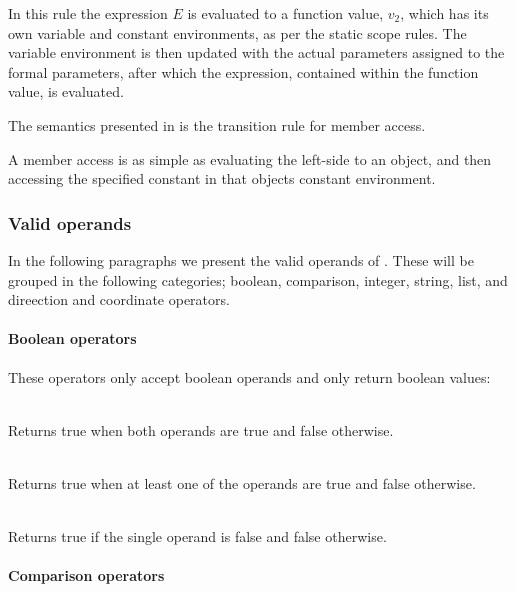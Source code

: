 In this rule the expression $E$ is evaluated to a function value, $v_2$, which
has its own variable and constant environments, as per the static scope rules.
The variable environment is then updated with the actual parameters assigned to
the formal parameters, after which the expression, contained within the function
value, is evaluated.

The semantics presented in  is the transition rule
for member access.



A member access is as simple as evaluating the left-side to an object, and then
accessing the specified constant in that objects constant environment.

\subsubsection{Valid operands}
\label{sec:validoperands}
In the following paragraphs we present the valid operands of
\productname{}. These will be grouped in the following categories; boolean,
comparison, integer, string, list, and direection and coordinate operators.

\paragraph{Boolean operators}

These operators only accept boolean operands and only return boolean values:

\begin{dlist}
  \item {}\\
    Returns true when both operands are true and false otherwise. 
  \item {}\\
    Returns true when at least one of the operands are true and false otherwise.
  \item {}\\
    Returns true if the single operand is false and false otherwise.
\end{dlist}

\paragraph{Comparison operators}

